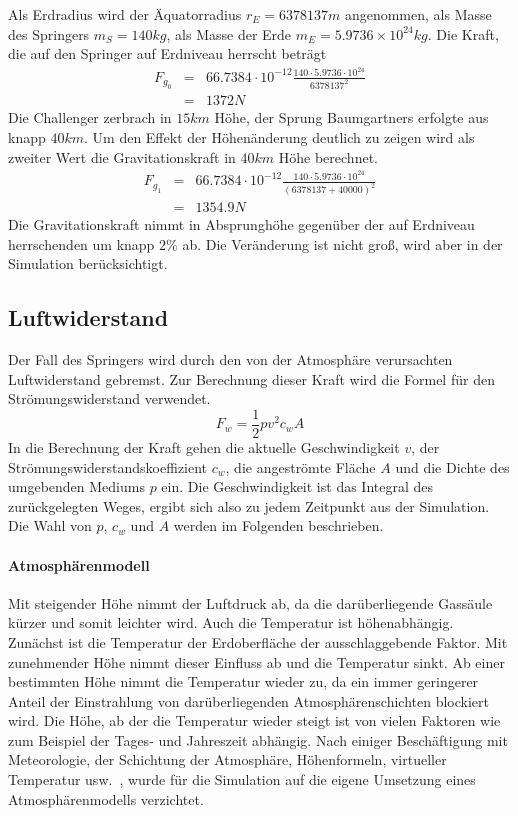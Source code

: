 Als Erdradius wird der Äquatorradius $r_E=6 378 137m$ angenommen, als Masse des Springers $m_S=140kg$, als Masse der Erde $m_E=5.9736\times 10^{24}kg$.
Die Kraft, die auf den Springer auf Erdniveau herrscht beträgt
\begin{eqnarray}
F_{g_0} &=& 66.7384\cdot 10^{-12} \frac{140\cdot 5.9736\cdot 10^{24}}{6 378 137^2} \\
 &=& 1372 N \nonumber
\end{eqnarray}
Die Challenger zerbrach in $15km$ Höhe, der Sprung Baumgartners erfolgte aus knapp $40km$.
Um den Effekt der Höhenänderung deutlich zu zeigen wird als zweiter Wert die Gravitationskraft in $40km$ Höhe berechnet.
\begin{eqnarray}
F_{g_1} &=& 66.7384\cdot 10^{-12} \frac{140\cdot 5.9736\cdot 10^{24}}{\left(6 378 137 + 40 000\right)^2} \\
 &=& 1354.9 N \nonumber
\end{eqnarray}
Die Gravitationskraft nimmt in Absprunghöhe gegenüber der auf Erdniveau herrschenden um knapp $2\%$ ab.
Die Veränderung ist nicht groß, wird aber in der Simulation berücksichtigt.

\subsection{Luftwiderstand}
Der Fall des Springers wird durch den von der Atmosphäre verursachten Luftwiderstand gebremst.
Zur Berechnung dieser Kraft wird die Formel für den Strömungswiderstand verwendet.
\begin{equation}
F_w=\frac{1}{2}pv^2c_wA
\end{equation}
In die Berechnung der Kraft gehen die aktuelle Geschwindigkeit $v$, der Strömungswiderstandskoeffizient $c_w$, die angeströmte Fläche $A$ und die Dichte des umgebenden Mediums $p$ ein.
Die Geschwindigkeit ist das Integral des zurückgelegten Weges, ergibt sich also zu jedem Zeitpunkt aus der Simulation.
Die Wahl von $p$, $c_w$ und $A$ werden im Folgenden beschrieben.

\paragraph{Atmosphärenmodell}
Mit steigender Höhe nimmt der Luftdruck ab, da die darüberliegende Gassäule kürzer und somit leichter wird.
Auch die Temperatur ist höhenabhängig.
Zunächst ist die Temperatur der Erdoberfläche der ausschlaggebende Faktor.
Mit zunehmender Höhe nimmt dieser Einfluss ab und die Temperatur sinkt.
Ab einer bestimmten Höhe nimmt die Temperatur wieder zu, da ein immer geringerer Anteil der Einstrahlung von darüberliegenden Atmosphärenschichten blockiert wird.
Die Höhe, ab der die Temperatur wieder steigt ist von vielen Faktoren wie zum Beispiel der Tages- und Jahreszeit abhängig.
Nach einiger Beschäftigung mit Meteorologie, der Schichtung der Atmosphäre, Höhenformeln, virtueller Temperatur usw.~\cite{met:einfuehrung, met:umwelt}, wurde für die Simulation auf die eigene Umsetzung eines Atmosphärenmodells verzichtet.

